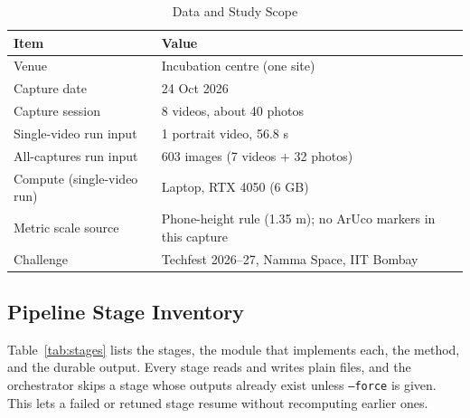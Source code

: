 \documentclass[conference]{IEEEtran}
\begin{document}
\begin{table}[!htb]
\centering
\footnotesize
\caption{Data and Study Scope}
\label{tab:dataset_scope}
\begin{tabular}{p{}p{}}
\toprule
\textbf{Item} & \textbf{Value} \\
\midrule
Venue & Incubation centre (one site) \\
Capture date & 24 Oct 2026 \\
Capture session & 8 videos, about 40 photos \\
Single-video run input & 1 portrait video, 56.8 s \\
All-captures run input & 603 images (7 videos + 32 photos) \\
Compute (single-video run) & Laptop, RTX 4050 (6 GB) \\
Metric scale source & Phone-height rule (1.35 m); no ArUco markers in this capture \\
Challenge & Techfest 2026--27, Namma Space, IIT Bombay \\
\bottomrule
\end{tabular}
\end{table}

\subsection{Pipeline Stage Inventory}
Table~\ref{tab:stages} lists the stages, the module that implements each, the method, and the durable output. Every stage reads and writes plain files, and the orchestrator skips a stage whose outputs already exist unless \texttt{--force} is given. This lets a failed or retuned stage resume without recomputing earlier ones.
\end{document}
